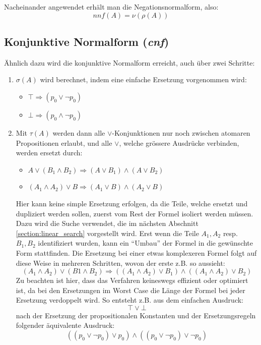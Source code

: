 \documentclass[11pt,a4paper,ngerman]{scrreprt}
\begin{document}
Nacheinander angewendet erhält man die Negationsnormalform, also:
\begin{equation}
nnf(A) = \nu(\rho(A))
\end{equation}

\subsection{Konjunktive Normalform (\textit{cnf})}
Ähnlich dazu wird die konjunktive Normalform erreicht, auch über zwei Schritte:

\begin{enumerate}
 \item $\sigma(A)$ wird berechnet, indem eine einfache Ersetzung vorgenommen wird:
 \begin{itemize}
  \item $\top \Rightarrow (p_0 \vee \neg p_0)$
  \item $\bot \Rightarrow (p_0 \wedge \neg p_0)$
 \end{itemize}

 \item Mit $\tau(A)$ werden dann alle $\vee$-Konjunktionen nur noch zwischen atomaren Propositionen erlaubt, und alle $\vee$, welche grössere Ausdrücke verbinden, werden ersetzt durch:
 \begin{itemize}
 \item $A \vee (B_1 \wedge B_2) \Rightarrow (A \vee B_1) \wedge (A \vee B_2)$
 \item $(A_1 \wedge A_2) \vee B \Rightarrow (A_1 \vee B) \wedge (A_2 \vee B)$
 \end{itemize}
 Hier kann keine simple Ersetzung erfolgen, da die Teile, welche ersetzt und dupliziert werden sollen, zuerst vom Rest der Formel isoliert werden müssen. Dazu wird die Suche verwendet, die im nächsten Abschnitt \ref{section:linear_search} vorgestellt wird. Erst wenn die Teile $A_1, A_2$ resp. $B_1, B_2$ identifiziert wurden, kann ein ``Umbau'' der Formel in die gewünschte Form stattfinden.
 Die Ersetzung bei einer etwas komplexeren Formel folgt auf diese Weise in mehreren Schritten, wovon der erste z.B. so aussieht:
 \begin{equation}
 (A_1 \wedge A_2) \vee (B1 \wedge B_2) \Rightarrow ((A_1 \wedge A_2) \vee B_1) \wedge ((A_1 \wedge A_2) \vee B_2)
 \end{equation}
 Zu beachten ist hier, dass das Verfahren keineswegs effizient oder optimiert ist, da bei den Ersetzungen im Worst Case die Länge der Formel bei jeder Ersetzung verdoppelt wird. So entsteht z.B. aus dem einfachen Ausdruck:
 \begin{equation}
 \top \vee \bot
 \end{equation}
 nach der Ersetzung der propositionalen Konstanten und der Ersetzungsregeln folgender äquivalente Ausdruck:
 \begin{equation}
 ( ( p_0 \vee \neg p_0 ) \vee p_0 ) \wedge ( ( p_0 \vee \neg p_0 ) \vee \neg p_0 )
 \end{equation}
\end{enumerate}
\end{document}
